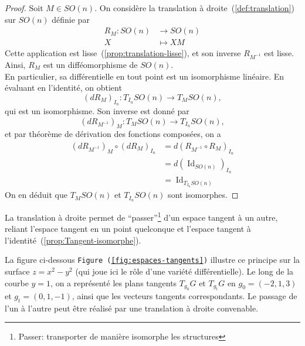 \documentclass[12pt]{report}
\begin{document}
\begin{proof}
Soit $M \in SO(n)$. On considère la translation à droite~(\ref{def:translation}) sur $SO(n)$ définie par
\[
\begin{aligned}
R_M : SO(n) &\longrightarrow SO(n)\\
X &\longmapsto XM
\end{aligned}
\]
Cette application est lisse~(\ref{prop:translation-lisse}), et son inverse $R_{M^{-1}}$ est lisse. Ainsi, $R_M$ est un difféomorphisme de $SO(n)$.\\
En particulier, sa différentielle en tout point est un isomorphisme linéaire. En évaluant en l'identité, on obtient
\[
{(dR_M)}_{I_n} : T_{I_n}SO(n) \longrightarrow T_M SO(n),
\]
qui est un isomorphisme.
Son inverse est donné par
\[
{(dR_{M^{-1}})}_{M} : T_M SO(n) \longrightarrow T_{I_n}SO(n),
\]
et par théorème de dérivation des fonctions composées, on a
\[
\begin{aligned}
{(dR_{M^{-1}})}_M\circ{(dR_M)}_{I_n}
&=d{(R_{M^{-1}}\circ R_M)}_{I_n}\\
&=d{(\operatorname{Id}_{SO(n)})}_{I_n}\\
&=\operatorname{Id}_{T_{I_n}SO(n)}
\end{aligned}
\]
On en déduit que $T_M SO(n)$ et $T_{I_n}SO(n)$ sont isomorphes.
\end{proof}

\begin{remark}
La translation à droite permet de ``passer''\footnote{Passer: transporter de manière isomorphe les structures} d'un espace tangent à un autre, reliant l'espace tangent en un point quelconque et l'espace tangent à l'identité~(\ref{prop:Tangent-isomorphe}).
\end{remark}

\begin{exemple}
La figure ci-dessous \texttt{Figure~(\ref{fig:espaces-tangents})} illustre ce principe sur la surface $z=x^2-y^2$ (qui joue ici le rôle d'une variété différentielle). Le long de la courbe $y=1$, on a représenté les plans tangents ${T}_{g_0}G$ et ${T}_{g_t}G$ en $g_0=(-2,1,3)$ et $g_t=(0,1,-1)$, ainsi que les vecteurs tangents correspondants. Le passage de l'un à l'autre peut être réalisé par une translation à droite convenable.
\end{exemple}
\end{document}
